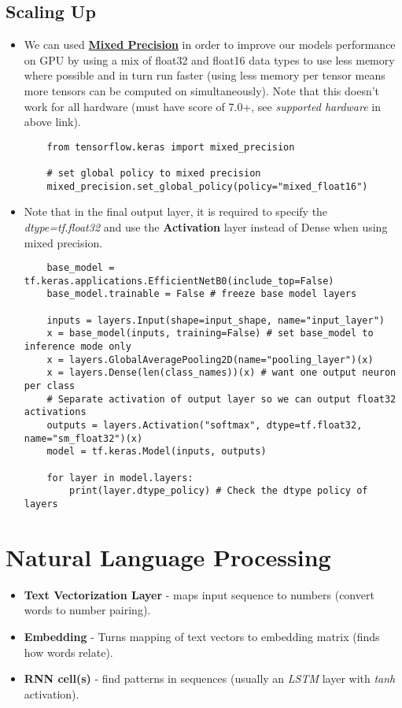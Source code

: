 \documentclass[11pt, a4paper]{article}
\begin{document}
	\subsection{Scaling Up}
	\begin{itemize}
		\item We can used \href{https://www.tensorflow.org/guide/mixed_precision}{\textbf{Mixed Precision}} in order to improve our models performance on GPU by using a mix of float32 and float16 data types to use less memory where possible and in turn run faster (using less memory per tensor means more tensors can be computed on simultaneously). Note that this doesn't work for all hardware (must have score of 7.0+, see \textit{supported hardware} in above link).
	\begin{lstlisting}
	from tensorflow.keras import mixed_precision
	
	# set global policy to mixed precision
	mixed_precision.set_global_policy(policy="mixed_float16") \end{lstlisting}
		\item Note that in the final output layer, it is required to specify the \textit{dtype=tf.float32} and use the \textbf{Activation} layer instead of Dense when using mixed precision.
	\begin{lstlisting}
	base_model = tf.keras.applications.EfficientNetB0(include_top=False)
	base_model.trainable = False # freeze base model layers

	inputs = layers.Input(shape=input_shape, name="input_layer")
	x = base_model(inputs, training=False) # set base_model to inference mode only
	x = layers.GlobalAveragePooling2D(name="pooling_layer")(x)
	x = layers.Dense(len(class_names))(x) # want one output neuron per class 
	# Separate activation of output layer so we can output float32 activations
	outputs = layers.Activation("softmax", dtype=tf.float32, name="sm_float32")(x) 
	model = tf.keras.Model(inputs, outputs)	

	for layer in model.layers:
		print(layer.dtype_policy) # Check the dtype policy of layers\end{lstlisting}
	\end{itemize} \newpage


	\section{Natural Language Processing}
	\begin{itemize}
		\item \textbf{Text Vectorization Layer} - maps input sequence to numbers (convert words to number pairing).
		\item \textbf{Embedding} - Turns mapping of text vectors to embedding matrix (finds how words relate).
		\item \textbf{RNN cell(s)} - find patterns in sequences (usually an \textit{LSTM} layer with \textit{tanh} activation).
	\end{itemize}
\end{document}
